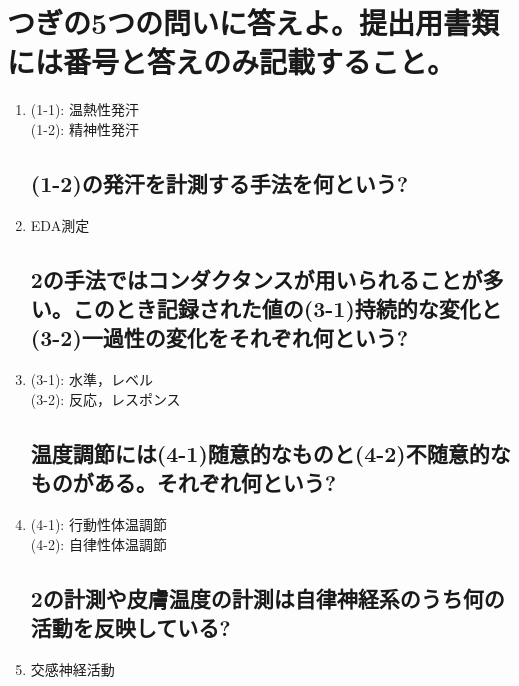 \documentclass[titlepage,a4paper]{jsarticle}
\begin{document}
\section{つぎの5つの問いに答えよ。提出用書類には番号と答えのみ記載すること。}%
\begin{enumerate}
      \subsection{発汗には大きく分けて2種類の機能がある。(1-1)環境温度が高いときに起こる発汗と(1-2)緊張などによって起こる発汗をそれぞれ何という?}
      \item (1-1): 温熱性発汗\\
            (1-2): 精神性発汗
            \subsection{(1-2)の発汗を計測する手法を何という?}
      \item EDA測定
            \subsection{2の手法ではコンダクタンスが用いられることが多い。このとき記録された値の(3-1)持続的な変化と(3-2)一過性の変化をそれぞれ何という?}
      \item(3-1): 水準，レベル\\
            (3-2): 反応，レスポンス
            \subsection{温度調節には(4-1)随意的なものと(4-2)不随意的なものがある。それぞれ何という?}
      \item (4-1): 行動性体温調節\\
            (4-2): 自律性体温調節
            \subsection{2の計測や皮膚温度の計測は自律神経系のうち何の活動を反映している?}
      \item 交感神経活動
\end{enumerate}
\end{document}
